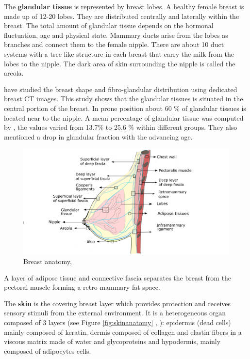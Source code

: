 The \textbf{ glandular tissue} is represented by breast lobes. A healthy female breast is made up of 12-20 lobes. They are distributed centrally and laterally within the breast. The total amount of glandular tissue depends on the hormonal fluctuation, age and physical state.  Mammary ducts arise from the lobes as branches and connect them to the female nipple. There are about 10 duct systems with a tree-like structure in each breast that carry the milk from the lobes to the nipple. The dark area of skin surrounding the nipple is called the areola.

 \cite{huang2011characterization} have studied the breast shape and fibro-glandular distribution using dedicated breast CT images. This study shows that the glandular tissues is situated in the central portion of the breast. In prone position about 60 $\%$ of glandular tissues is located near to the nipple. A mean percentage of glandular tissue was computed by \cite{yaffe2009myth}, the values varied from 13.7$\%$ to 25.6 $\%$ within different groups. They also mentioned a drop in glandular fraction with the advancing age. 


\begin{center}
\begin{figure}[h]
\includegraphics[width=\textwidth,keepaspectratio]{figures/anatomieSeinEuBlack2.png} 
\caption{Breast anatomy, \citep{clemente2011anatomy}}
\label{fig:breastanatomy}
\end{figure}
\end{center}

 A layer of adipose tissue and connective fascia separates the breast from the pectoral muscle forming a retro-mammary fat space.
 
The \textbf{skin} is the covering breast layer which provides protection and receives sensory stimuli from the external environment. It is a heterogeneous organ composed of 3 layers (see Figure \ref{fig:skinanatomy} , \citep{kanitakis2002anatomy} ): epidermis (dead cells) mainly composed of keratin, dermis composed of collagen and elastin fibers in a viscous matrix made of water and glycoproteins and hypodermis, mainly composed of adipocytes cells.


